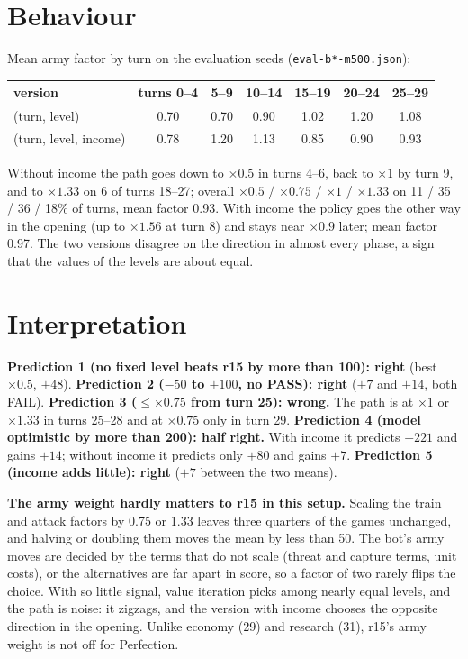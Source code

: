 \documentclass{../polyexp}
\begin{document}
\section{Behaviour}
Mean army factor by turn on the evaluation seeds (\texttt{eval-b*-m500.json}):

\begin{center}\small
\begin{tabular}{lcccccc}
\toprule
version & turns 0--4 & 5--9 & 10--14 & 15--19 & 20--24 & 25--29 \\
\midrule
(turn, level)         & 0.70 & 0.70 & 0.90 & 1.02 & 1.20 & 1.08 \\
(turn, level, income) & 0.78 & 1.20 & 1.13 & 0.85 & 0.90 & 0.93 \\
\bottomrule
\end{tabular}
\end{center}

Without income the path goes down to $\times0.5$ in turns 4--6, back to $\times1$ by turn 9, and to $\times1.33$ on
6 of turns 18--27; overall $\times0.5$ / $\times0.75$ / $\times1$ / $\times1.33$ on 11 / 35 / 36 / 18\% of turns, mean
factor 0.93. With income the policy goes the other way in the opening (up to $\times1.56$ at turn 8) and stays near
$\times0.9$ later; mean factor 0.97. The two versions disagree on the direction in almost every phase, a sign that
the values of the levels are about equal.

\section{Interpretation}
\textbf{Prediction 1 (no fixed level beats r15 by more than 100): right} (best $\times0.5$, $+48$).
\textbf{Prediction 2 ($-50$ to $+100$, no PASS): right} ($+7$ and $+14$, both FAIL).
\textbf{Prediction 3 ($\le\times0.75$ from turn 25): wrong.} The path is at $\times1$ or $\times1.33$ in turns 25--28
and at $\times0.75$ only in turn 29.
\textbf{Prediction 4 (model optimistic by more than 200): half right.} With income it predicts $+221$ and gains $+14$;
without income it predicts only $+80$ and gains $+7$.
\textbf{Prediction 5 (income adds little): right} ($+7$ between the two means).

\textbf{The army weight hardly matters to r15 in this setup.} Scaling the train and attack factors by 0.75 or 1.33
leaves three quarters of the games unchanged, and halving or doubling them moves the mean by less than 50. The
bot's army moves are decided by the terms that do not scale (threat and capture terms, unit costs), or the
alternatives are far apart in score, so a factor of two rarely flips the choice. With so little signal, value
iteration picks among nearly equal levels, and the path is noise: it zigzags, and the version with income chooses
the opposite direction in the opening. Unlike economy (29) and research (31), r15's army weight is not off for
Perfection.
\end{document}
